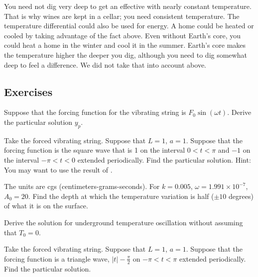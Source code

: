 You need not dig very deep to get an effective
 with nearly constant temperature.  That is why wines are kept in a cellar; you need consistent
temperature.
The temperature differential could also be used for energy.  A home could
be heated or cooled by taking advantage of the fact above.
Even without Earth's core, you could heat a home in the winter and cool it
in the summer.  Earth's core makes the
temperature higher the deeper you dig, although you need to dig somewhat
deep to feel a difference.
We did not take that into account above.

\subsection{Exercises}

\begin{exercise} \label{sps:sinforceexr}
Suppose that the forcing function for the vibrating string
is $F_0 \sin (\omega t)$.  Derive the particular solution $y_p$.
\end{exercise}

\begin{exercise}
Take the forced vibrating string.
Suppose that $L=1$, $a=1$.  Suppose that the forcing function
is the square wave that is 1 on the interval $0 < t < \pi$ and
$-1$ on the interval $-\pi < t < 0$ extended periodically.
Find the particular solution.  Hint: You may want to use the result
of .
\end{exercise}

\begin{exercise}
The units are cgs (centimeters-grams-seconds).
For $k=0.005$, $\omega = 1.991 \times {10}^{-7}$, $A_0 = 20$.
Find the depth at which the temperature variation is half ($\pm 10$
degrees) of what it is on the surface.
\end{exercise}

\begin{exercise}
Derive the solution for underground temperature oscillation without assuming
that $T_0 = 0$.
\end{exercise}

\setcounter{exercise}{100}

\begin{exercise}
Take the forced vibrating string.
Suppose that $L=1$, $a=1$.  Suppose that the forcing function
is a triangle wave, $\lvert t \rvert -\frac{\pi}{2}$
on $-\pi < t < \pi$ extended periodically.
Find the particular solution.
\end{exercise}

